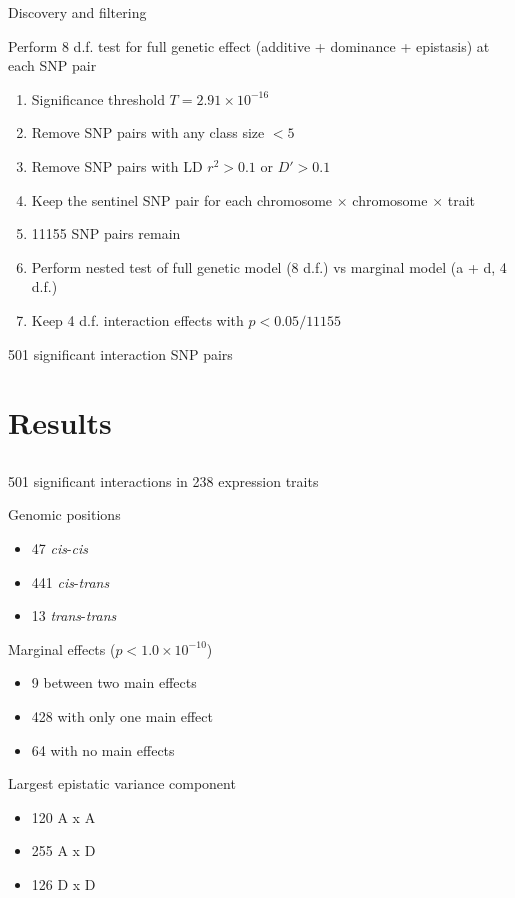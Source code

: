 \documentclass{beamer}
\begin{document}
\begin{frame}{Discovery and filtering}
	\begin{block}{}
		Perform 8 d.f. test for full genetic effect (additive + dominance + epistasis) at each SNP pair
	\end{block}
	\begin{enumerate}
		\item Significance threshold $T = 2.91 \times 10^{-16}$
		\item Remove SNP pairs with any class size $< 5$
		\item Remove SNP pairs with LD $r^2 > 0.1$ or $D' > 0.1$
		\item Keep the sentinel SNP pair for each chromosome $\times$ chromosome $\times$ trait
		\item 11155 SNP pairs remain
		\item Perform nested test of full genetic model (8 d.f.) vs marginal model (a + d, 4 d.f.)
		\item Keep 4 d.f. interaction effects with $p < 0.05 / 11155$
	\end{enumerate}
	\begin{block}{}
		501 significant interaction SNP pairs
	\end{block}
\end{frame}


\section{Results}
\subsection{}

\begin{frame}{501 significant interactions in 238 expression traits}
	\begin{block}{Genomic positions}
		\begin{itemize}
			\item 47 \emph{cis}-\emph{cis}
			\item 441 \emph{cis}-\emph{trans}
			\item 13 \emph{trans}-\emph{trans}
		\end{itemize}
	\end{block}
	\pause
	\begin{block}{Marginal effects ($p < 1.0 \times 10^{-10}$)}
		\begin{itemize}
			\item 9 between two main effects
			\item 428 with only one main effect
			\item 64 with no main effects
		\end{itemize}
	\end{block}
	\pause
	\begin{block}{Largest epistatic variance component}
		\begin{itemize}
			\item 120 A x A
			\item 255 A x D
			\item 126 D x D
		\end{itemize}
	\end{block}
\end{frame}
\end{document}
